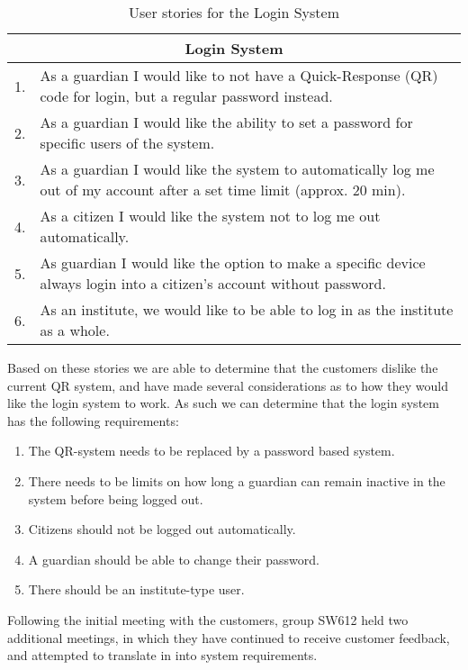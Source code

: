 \begin{table}[H]
\begin{tabular}{|c|p{12.5cm}|}
\hline 
\multicolumn{2}{|c|}{Login System}\\ \hline 
1. & As a guardian I would like to not have a Quick-Response (QR) code for
login, but a regular password instead.\\ \hline 
2. & As a guardian I would like the ability to set a password for specific users
of the system.\\ \hline
3. & As a guardian I would like the system to automatically log me out of my
account after a set time limit (approx. 20 min).\\ \hline
4. & As a citizen I would like the system not to log me out automatically.\\ \hline
5. & As guardian I would like the option to make a specific device always login
into a citizen's account without password.\\ \hline
6. & As an institute, we would like to be able to log in as the institute as a
whole.\\\hline
\end{tabular}
\caption{User stories for the Login System}
\label{UserStoriesLogin}
\end{table}
 
Based on these stories we are able to determine that the customers dislike the
current QR system, and have made several considerations as to how they would
like the login system to work. As such we can determine that the login system
has the following requirements:

\begin{enumerate}
   \item The QR-system needs to be replaced by a password based system.
   \item There needs to be limits on how long a guardian can remain inactive in
   the system before being logged out.
   \item Citizens should not be logged out automatically. 
   \item A guardian should be able to change their password.
   \item There should be an institute-type user.
\end{enumerate}

Following the initial meeting with the customers, group SW612 held two
additional meetings, in which they have continued to receive customer feedback,
and attempted to translate in into system requirements. 












